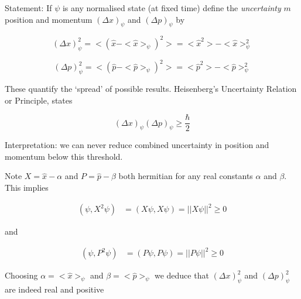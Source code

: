 \documentclass[a4paper]{article}
\begin{document}
Statement: If $ \psi $ is any normalised state (at fixed time) define the \emph{uncertainty} $ m $ position and momentum $ (\Delta x)_{\psi} $ and $ (\Delta p)_{\psi} $ by

\[ (\Delta x)_{\psi}^{2} = < (\hat{x}  - <\hat{x}>_{\psi} )^{2} > = <\hat{x}^{2} > - <\hat{x}>_{\psi}^{2} \]

\[ (\Delta p)_{\psi}^{2} = < (\hat{p}  - <\hat{p}>_{\psi} )^{2} > = <\hat{p}^{2} > - <\hat{p}>_{\psi}^{2} \]

These quantify the `spread' of possible results. Heisenberg's Uncertainty Relation or Principle, states

\[ (\Delta x)_{\psi} (\Delta p)_{\psi} \geq \frac{\hbar}{2} \]

Interpretation: we can never reduce combined uncertainty in position and momentum below this threshold. 


Note $ X = \hat{x} - \alpha $ and $ P = \hat{p} - \beta $ both hermitian for any real constants $ \alpha $ and $ \beta $. This implies 

\begin{align*}
(\psi, X^{2}\psi)& = (X\psi, X\psi)  = | | X \psi | |^{2} \geq 0
\end{align*}

and 

\begin{align*}
(\psi, P^{2}\psi)& = (P\psi, P\psi)  = | | P \psi | |^{2} \geq 0
\end{align*}

Choosing $ \alpha = <\hat{x}>_{\psi} $ and $ \beta = <\hat{p}>_{\psi} $ we deduce that $ (\Delta x)_{\psi}^{2}  $ and $ (\Delta p)_{\psi}^{2} $ are indeed real and positive
\end{document}
